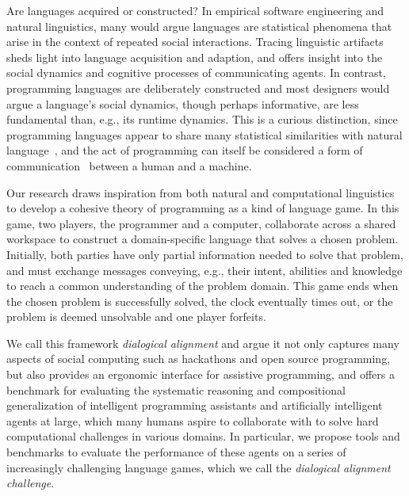\documentclass[sigplan,screen]{acmart}
\begin{document}

Are languages acquired or constructed? In empirical software engineering and natural linguistics, many would argue languages are statistical phenomena that arise in the context of repeated social interactions. Tracing linguistic artifacts sheds light into language acquisition and adaption, and offers insight into the social dynamics and cognitive processes of communicating agents. In contrast, programming languages are deliberately constructed and most designers would argue a language's social dynamics, though perhaps informative, are less fundamental than, e.g., its runtime dynamics. This is a curious distinction, since programming languages appear to share many statistical similarities with natural language~\cite{hindle2016naturalness}, and the act of programming can itself be considered a form of communication~\cite{demillo1979social} between a human and a machine.

Our research draws inspiration from both natural and computational linguistics to develop a cohesive theory of programming as a kind of language game. In this game, two players, the programmer and a computer, collaborate across a shared workspace to construct a domain-specific language that solves a chosen problem. Initially, both parties have only partial information needed to solve that problem, and must exchange messages conveying, e.g., their intent, abilities and knowledge to reach a common understanding of the problem domain. This game ends when the chosen problem is successfully solved, the clock eventually times out, or the problem is deemed unsolvable and one player forfeits.

We call this framework \emph{dialogical alignment} and argue it not only captures many aspects of social computing such as hackathons and open source programming, but also provides an ergonomic interface for assistive programming, and offers a benchmark for evaluating the systematic reasoning and compositional generalization of intelligent programming assistants and artificially intelligent agents at large, which many humans aspire to collaborate with to solve hard computational challenges in various domains. In particular, we propose tools and benchmarks to evaluate the performance of these agents on a series of increasingly challenging language games, which we call the \emph{dialogical alignment challenge}.
\end{document}
